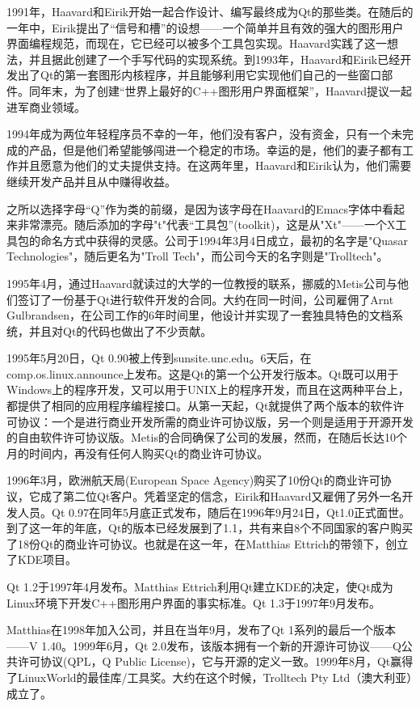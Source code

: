 \documentclass[11pt,oneside]{book}
\begin{document}
\begin{common-format}
1991年，Haavard和Eirik开始一起合作设计、编写最终成为Qt的那些类。在随后的一年中，Eirik提出了“信号和槽”的设想——一个简单并且有效的强大的图形用户界面编程规范，而现在，它已经可以被多个工具包实现。Haavard实践了这一想法，并且据此创建了一个手写代码的实现系统。到1993年，Haavard和Eirik已经开发出了Qt的第一套图形内核程序，并且能够利用它实现他们自己的一些窗口部件。同年末，为了创建“世界上最好的C++图形用户界面框架”，Haavard提议一起进军商业领域。

1994年成为两位年轻程序员不幸的一年，他们没有客户，没有资金，只有一个未完成的产品，但是他们希望能够闯进一个稳定的市场。幸运的是，他们的妻子都有工作并且愿意为他们的丈夫提供支持。在这两年里，Haavard和Eirik认为，他们需要继续开发产品并且从中赚得收益。

之所以选择字母“Q”作为类的前缀，是因为该字母在Haavard的Emacs字体中看起来非常漂亮。随后添加的字母"t"代表“工具包”(toolkit)，这是从"Xt"——一个X工具包的命名方式中获得的灵感。公司于1994年3月4日成立，最初的名字是"Quasar Technologies"，随后更名为"Troll Tech"，而公司今天的名字则是"Trolltech"。

1995年4月，通过Haavard就读过的大学的一位教授的联系，挪威的Metis公司与他们签订了一份基于Qt进行软件开发的合同。大约在同一时间，公司雇佣了Arnt Gulbrandsen，在公司工作的6年时间里，他设计并实现了一套独具特色的文档系统，并且对Qt的代码也做出了不少贡献。

1995年5月20日，Qt 0.90被上传到sunsite.unc.edu。6天后，在\\ comp.os.linux.announce上发布。这是Qt的第一个公开发行版本。Qt既可以用于Windows上的程序开发，又可以用于UNIX上的程序开发，而且在这两种平台上，都提供了相同的应用程序编程接口。从第一天起，Qt就提供了两个版本的软件许可协议：一个是进行商业开发所需的商业许可协议版，另一个则是适用于开源开发的自由软件许可协议版。Metis的合同确保了公司的发展，然而，在随后长达10个月的时间内，再没有任何人购买Qt的商业许可协议。

1996年3月，欧洲航天局(European Space Agency)购买了10份Qt的商业许可协议，它成了第二位Qt客户。凭着坚定的信念，Eirik和Haavard又雇佣了另外一名开发人员。Qt 0.97在同年5月底正式发布，随后在1996年9月24日，Qt1.0正式面世。到了这一年的年底，Qt的版本已经发展到了1.1，共有来自8个不同国家的客户购买了18份Qt的商业许可协议。也就是在这一年，在Matthias Ettrich的带领下，创立了KDE项目。

Qt 1.2于1997年4月发布。Matthias Ettrich利用Qt建立KDE的决定，使Qt成为Linux环境下开发C++图形用户界面的事实标准。Qt 1.3于1997年9月发布。

Matthias在1998年加入公司，并且在当年9月，发布了Qt 1系列的最后一个版本——V 1.40。1999年6月，Qt 2.0发布，该版本拥有一个新的开源许可协议——Q公共许可协议(QPL，Q Public License)，它与开源的定义一致。1999年8月，Qt赢得了LinuxWorld的最佳库/工具奖。大约在这个时候，Trolltech Pty Ltd（澳大利亚）成立了。


\end{common-format}
\end{document}
